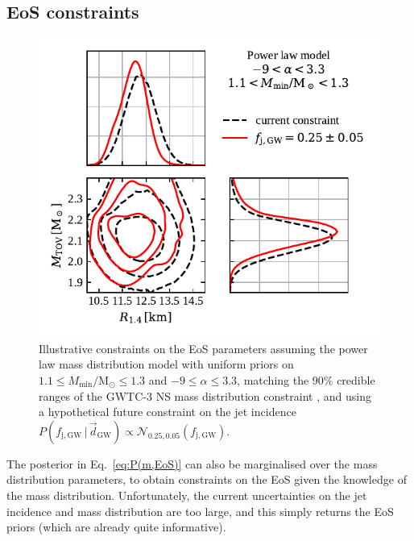 \documentclass[]{aa}
\newcommand{\resp}[1]{#1}
\begin{document}
\subsection{EoS constraints}
\label{sec:EoS_constraints}
%
\begin{figure} 
 \centering
 \includegraphics[width=\columnwidth]{figures/P_MTOV_R14_fjknown0.25.pdf}
 \caption{Illustrative constraints on the EoS parameters assuming \resp{the power law mass distribution model with uniform priors on $1.1\leq M_\mathrm{min}/\mathrm{M_\odot}\leq 1.3$ and $-9\leq \alpha\leq 3.3$, matching the 90\% credible ranges of the GWTC-3 NS mass distribution constraint \citep{LVC2021_GWTC3pop}, and using a hypothetical future constraint on the jet incidence $P(f_\mathrm{j,GW}\,|\,\vec d_\mathrm{GW})\propto \mathcal{N}_{0.25,0.05}(f_\mathrm{j,GW})$}.}  
 \label{fig:PEoS_fjknown025} 
\end{figure}  
%
The posterior in Eq.~\ref{eq:P(m,EoS)} can also be marginalised over the mass distribution parameters, to obtain constraints on the EoS given the knowledge of the mass distribution. Unfortunately, the current uncertainties on the jet \resp{incidence} and mass distribution are too large, and this simply returns the EoS priors (which are already quite informative).
\end{document}
